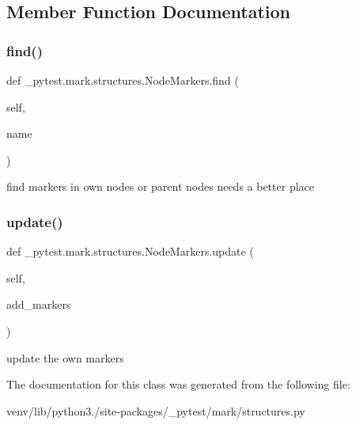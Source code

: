 \subsection{Member Function Documentation}
\mbox{\label{class__pytest_1_1mark_1_1structures_1_1_node_markers_ade453fc486862740e3f819ad9482d74f}} 
\subsubsection{\texorpdfstring{find()}{find()}}
{\footnotesize\ttfamily def \+\_\+pytest.\+mark.\+structures.\+Node\+Markers.\+find (\begin{DoxyParamCaption}\item[{}]{self,  }\item[{}]{name }\end{DoxyParamCaption})}

\begin{DoxyVerb}find markers in own nodes or parent nodes
needs a better place
\end{DoxyVerb}
 \mbox{\label{class__pytest_1_1mark_1_1structures_1_1_node_markers_a38241a5127ec43742fadc9d1f47da52f}} 
\subsubsection{\texorpdfstring{update()}{update()}}
{\footnotesize\ttfamily def \+\_\+pytest.\+mark.\+structures.\+Node\+Markers.\+update (\begin{DoxyParamCaption}\item[{}]{self,  }\item[{}]{add\+\_\+markers }\end{DoxyParamCaption})}

\begin{DoxyVerb}update the own markers
\end{DoxyVerb}
 

The documentation for this class was generated from the following file\+:\begin{DoxyCompactItemize}
\item 
venv/lib/python3./site-\/packages/\+\_\+pytest/mark/structures.\+py\end{DoxyCompactItemize}
